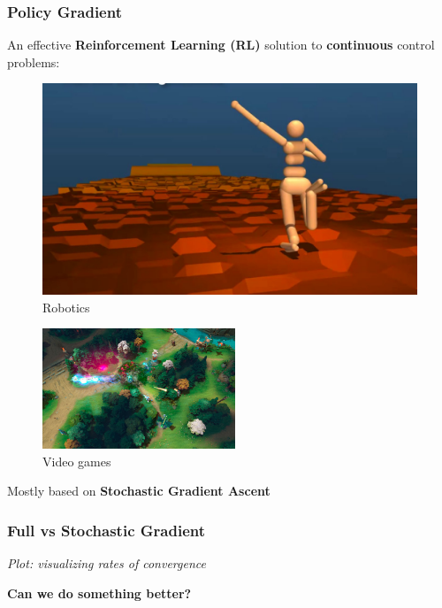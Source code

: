 \documentclass[aspectratio=169]{beamer}
\newcommand{\enb}[1]{\textcolor{poliblue1}{\textbf{#1}}}
\begin{document}
\begin{frame} 
\frametitle{Policy Gradient} 
An effective \enb{Reinforcement Learning (RL)} solution to \enb{continuous} control problems:

\begin{minipage}[t]{.4\paperwidth}
\begin{figure}
\includegraphics[width=\textwidth]{images/parkour.jpg}
\caption{Robotics~\citep{heess2017emergence}}
\end{figure}
\end{minipage}
\hfill%
\begin{minipage}[t]{.4\paperwidth}
\begin{figure}
\includegraphics[width=\textwidth, height=3.6cm]{images/dota.jpg}
\caption{Video games~\citep{openaifive}}
\end{figure}	
\end{minipage}

\vspace*{.5cm}

\large{Mostly based on \enb{Stochastic Gradient Ascent}~\citep{robbins1951stochastic}}

\end{frame}

\begin{frame} 
\frametitle{Full vs Stochastic Gradient} 
\textit{Plot: visualizing rates of convergence}

\Large{\enb{Can we do something better?}}

\end{frame}
\end{document}
